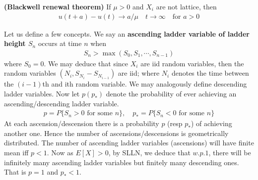 \documentclass[a4paper,10pt,english]{article}
\begin{document}
\begin{thm}
\textbf{(Blackwell renewal theorem)} If $\mu > 0$ and $X_i$ are not lattice, then
\begin{align*}u(t+a) - u(t) \to a/\mu \quad t\to \infty \quad \mbox{for }a>0\end{align*}
\end{thm}
Let us define a few concepts. We say an \textbf{ascending ladder variable of ladder height $S_n$} occurs at time $n$ when
\begin{align*}S_n > \max(S_0,S_1,\cdots, S_{n-1})\end{align*}
where $S_0 = 0$. We may deduce that since $X_i$ are iid random variables, then the random variables $(N_i,S_{N_i}-S_{N_{i-1}})$ are iid; where $N_i$ denotes the time between the $(i-1)$th and ith random variable. We may analogously define descending ladder variables. Now let $p(p_*)$ denote the probability of ever achieving an ascending/descending ladder variable.
\begin{align*}p = P\{S_n > 0 \mbox{ for some }n\},\quad p_* = P\{S_n < 0 \mbox{ for some }n\}\end{align*}
At each ascension/descension there is a probability $p$ (resp $p_*$) of achieving another one. Hence the number of ascensions/descensions is geometrically distributed. The number of ascending ladder variables (ascensions) will have finite mean iff $p < 1$. Now as $E[X] > 0$, by SLLN, we deduce that $w.p.1$, there will be infinitely many ascending ladder variables but finitely many descending ones. That is $p =1$ and $p_* < 1$.
\end{document}
